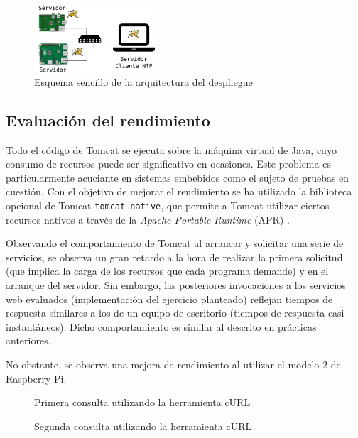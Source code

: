 \documentclass{article}
\newcommand{\txtcode}[4]{
	
}
\begin{document}
\begin{figure}[H]
  \begin{center}
    \includegraphics[width=0.4\textwidth]{arquitectura}
    \caption{Esquema sencillo de la arquitectura del despliegue}
  \end{center}
\end{figure}

\subsection{Evaluación del rendimiento}

Todo el código de Tomcat se ejecuta sobre la máquina virtual de Java, cuyo consumo de recursos puede ser significativo en ocasiones. Este problema es particularmente acuciante en sistemas embebidos como el sujeto de pruebas en cuestión. Con el objetivo de mejorar el rendimiento se ha utilizado la biblioteca opcional de Tomcat \verb+tomcat-native+, que permite a Tomcat utilizar ciertos recursos nativos a través de la \textit{Apache Portable Runtime} (APR) \cite{tomcatnative}.

Observando el comportamiento de Tomcat al arrancar y solicitar una serie de servicios, se observa un gran retardo a la hora de realizar la primera solicitud (que implica la carga de los recursos que cada programa demande) y en el arranque del servidor. Sin embargo, las posteriores invocaciones a los servicios web evaluados (implementación del ejercicio planteado) reflejan tiempos de respuesta similares a los de un equipo de escritorio (tiempos de respuesta casi instantáneos). Dicho comportamiento es similar al descrito en prácticas anteriores.

No obstante, se observa una mejora de rendimiento al utilizar el modelo 2 de Raspberry Pi.

\begin{figure}[H]
 \txtcode{../doc/tex/slow}{File}{1}{8}
 \caption{Primera consulta utilizando la herramienta cURL \cite{cURLPerformance}}
\end{figure}
\begin{figure}[H]
 \txtcode{../doc/tex/fast}{File}{1}{8}
 \caption{Segunda consulta utilizando la herramienta cURL \cite{cURLPerformance}} 
\end{figure}
\end{document}
